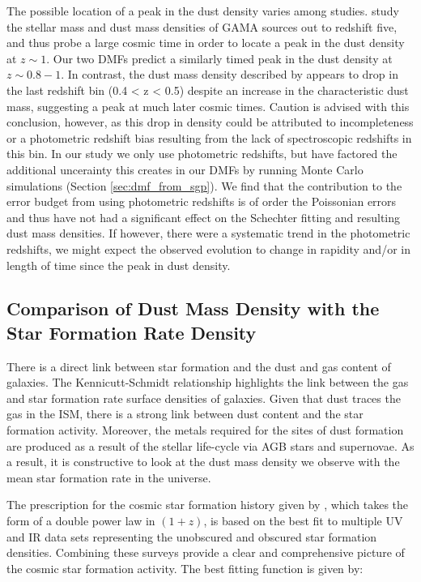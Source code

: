The possible location of a peak in the dust density varies among studies. \citealt{Driver_2018} study the stellar mass and dust mass densities of GAMA sources out to redshift five, and thus probe a large cosmic time in order to locate a peak in the dust density at $z \sim 1$. Our two DMFs predict a similarly timed peak in the dust density at $z \sim 0.8 - 1$. In contrast, the dust mass density described by \citealt{Dunne_2011} appears to drop in the last redshift bin (0.4 < z < 0.5) despite an increase in the characteristic dust mass, suggesting a peak at much later cosmic times. Caution is advised with this conclusion, however, as this drop in density could be attributed to incompleteness or a photometric redshift bias resulting from the lack of spectroscopic redshifts in this bin. In our study we only use photometric redshifts, but have factored the additional uncerainty this creates in our DMFs by running Monte Carlo simulations (Section \ref{sec:dmf_from_sgp}). We find that the contribution to the error budget from using photometric redshifts is of order the Poissonian errors and thus have not had a significant effect on the Schechter fitting and resulting dust mass densities. If however, there were a systematic trend in the photometric redshifts, we might expect the observed evolution to change in rapidity and/or in length of time since the peak in dust density.

\subsection{Comparison of Dust Mass Density with the Star Formation Rate Density}

There is a direct link between star formation and the dust and gas content of galaxies. The Kennicutt-Schmidt relationship highlights the link between the gas and star formation rate surface densities of galaxies. Given that dust traces the gas in the ISM, there is a strong link between dust content and the star formation activity. Moreover, the metals required for the sites of dust formation are produced as a result of the stellar life-cycle via AGB stars and supernovae. As a result, it is constructive to look at the dust mass density we observe with the mean star formation rate in the universe.

The prescription for the cosmic star formation history given by \citealt{Madau_2014}, which takes the form of a double power law in $(1 + z)$, is based on the best fit to multiple UV and IR data sets representing the unobscured and obscured star formation densities. Combining these surveys provide a clear and comprehensive picture of the cosmic star formation activity. The best fitting function is given by:

